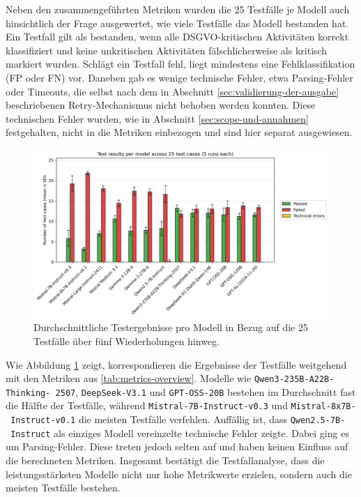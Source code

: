 Neben den zusammengeführten Metriken wurden die 25 Testfälle je Modell auch hinsichtlich der Frage ausgewertet, wie viele Testfälle das Modell bestanden hat. Ein Testfall gilt als bestanden, wenn alle \ac{DSGVO}-kritischen Aktivitäten korrekt klassifiziert und keine unkritischen Aktivitäten fälschlicherweise als kritisch markiert wurden. Schlägt ein Testfall fehl, liegt mindestens eine Fehlklassifikation (\ac{FP} oder \ac{FN}) vor. Daneben gab es wenige technische Fehler, etwa Parsing‑Fehler oder Timeouts, die selbst nach dem in Abschnitt  \ref{sec:validierung-der-ausgabe} beschriebenen Retry‑Mechanismus nicht behoben werden konnten. Diese technischen Fehler wurden, wie in Abschnitt \ref{sec:scope-und-annahmen} festgehalten, nicht in die Metriken einbezogen und sind hier separat ausgewiesen.

\begin{figure}[htbp]
    \centering
    \includegraphics[width=\textwidth]{images/results/evaluation_testcase_outcomes_grouped_en}
    \caption{Durchschnittliche Testergebnisse pro Modell in Bezug auf die 25 Testfälle über fünf Wiederholungen hinweg.}
    \label{fig:results-testcase-outcomes}
\end{figure}

Wie Abbildung \ref{fig:results-testcase-outcomes} zeigt, korrespondieren die Ergebnisse der Testfälle weitgehend mit den Metriken aus \autoref{tab:metrics-overview}. Modelle wie \texttt{Qwen3-235B-A22B-Thinking-\linebreak~2507}, \texttt{DeepSeek-V3.1} und \texttt{GPT-OSS-20B} bestehen im Durchschnitt fast die Hälfte der Testfälle, während \texttt{Mistral-7B-Instruct-v0.3} und \texttt{Mistral-8x7B-\linebreak~Instruct-v0.1} die meisten Testfälle verfehlen. Auffällig ist, dass \texttt{Qwen2.5-7B-\linebreak~Instruct} als einziges Modell vereinzelte technische Fehler zeigte. Dabei ging es um Parsing-Fehler. Diese treten jedoch selten auf und haben keinen Einfluss auf die berechneten Metriken. Insgesamt bestätigt die Testfallanalyse, dass die leistungsstärksten Modelle nicht nur hohe Metrikwerte erzielen, sondern auch die meisten Testfälle bestehen.
